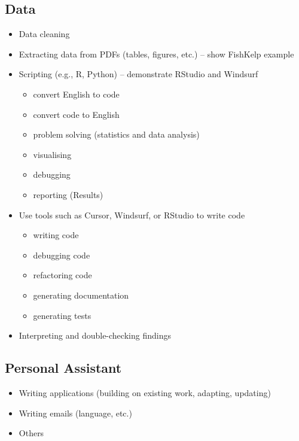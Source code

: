 \documentclass[
  10t,
]{article}
\providecommand{\tightlist}{%
  \setlength{\itemsep}{0pt}\setlength{\parskip}{0pt}}
\begin{document}
\subsection{Data}\label{data}

\begin{itemize}
\tightlist
\item
  Data cleaning
\item
  Extracting data from PDFs (tables, figures, etc.) -- show FishKelp
  example
\item
  Scripting (e.g., R, Python) -- demonstrate RStudio and Windsurf

  \begin{itemize}
  \tightlist
  \item
    convert English to code
  \item
    convert code to English
  \item
    problem solving (statistics and data analysis)
  \item
    visualising
  \item
    debugging
  \item
    reporting (Results)
  \end{itemize}
\item
  Use tools such as Cursor, Windsurf, or RStudio to write code

  \begin{itemize}
  \tightlist
  \item
    writing code
  \item
    debugging code
  \item
    refactoring code
  \item
    generating documentation
  \item
    generating tests
  \end{itemize}
\item
  Interpreting and double-checking findings
\end{itemize}

\subsection{Personal Assistant}\label{personal-assistant}

\begin{itemize}
\tightlist
\item
  Writing applications (building on existing work, adapting, updating)
\item
  Writing emails (language, etc.)
\item
  Others
\end{itemize}
\end{document}
